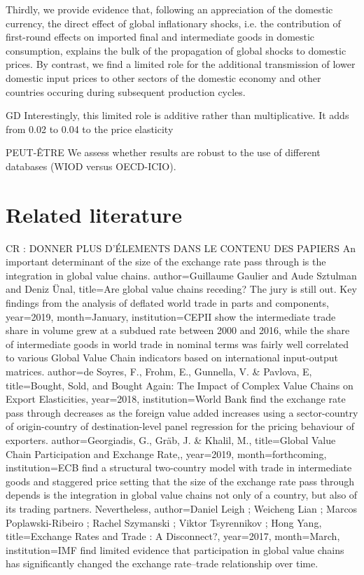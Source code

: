 \documentclass[11pt,a4paper]{article}
\begin{document}
Thirdly, we provide evidence that, following an appreciation of the domestic currency, the direct effect of global inflationary shocks, i.e. the contribution of first-round effects on imported final and intermediate goods in domestic consumption, explains the bulk of the propagation of global shocks to domestic prices. By contrast, we find a limited role for the additional transmission of lower domestic input prices to other sectors of the domestic economy and other countries occuring during subsequent production cycles.


GD Interestingly, this limited role is additive rather than multiplicative. It adds from 0.02 to 0.04 to the price elasticity

PEUT-ÊTRE We assess whether results are robust to the use of different databases (WIOD versus OECD-ICIO). 


\label{sec:intro}


\section{Related literature}
\label{sec:lit}

CR : DONNER PLUS D'ÉLEMENTS DANS LE CONTENU DES PAPIERS
An important determinant of the size of the exchange rate pass through is the integration in global value chains.
\cite{Gaulier2019} author={Guillaume Gaulier and Aude Sztulman and Deniz Ünal}, title={Are global value chains receding? The jury is still out. Key findings from the analysis of deflated world trade in parts and components}, year=2019, month=January, institution={CEPII} show the intermediate trade share in volume grew at a subdued rate between 2000 and 2016, while the share of intermediate goods in world trade in nominal terms was fairly well correlated to various Global Value Chain indicators based on international input-output matrices.  
\cite{DeSoyres2018} author={de Soyres, F., Frohm, E., Gunnella, V. & Pavlova, E}, title={Bought, Sold, and Bought Again: The Impact of Complex Value Chains on Export Elasticities}, year=2018, institution={World Bank} find the exchange rate pass through decreases as the foreign value added increases using a sector-country of origin-country of destination-level panel regression for the pricing behaviour of exporters. 
\cite{Georgiadis2019} author={Georgiadis, G., Gräb, J. & Khalil, M.}, title={Global Value Chain Participation and Exchange Rate,}, year=2019, month=forthcoming, institution={ECB} find a structural two-country model with trade in intermediate goods and staggered price setting that the size of the exchange rate pass through depends is the integration in global value chains not only of a country, but also of its trading partners.
Nevertheless, \cite{Leigh2017}  author={Daniel Leigh ; Weicheng Lian ; Marcos Poplawski-Ribeiro ; Rachel Szymanski ; Viktor Tsyrennikov ; Hong Yang}, title={Exchange Rates and Trade : A Disconnect?}, year=2017, month=March, institution={IMF} find limited evidence that participation in global value chains has significantly changed the exchange rate–trade relationship over time.
\end{document}
